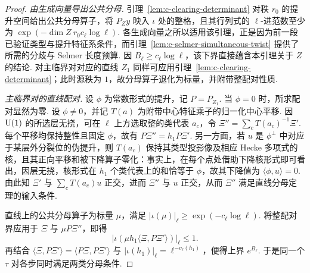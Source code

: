 \begin{proof}
\emph{由生成向量导出公共分母.}
引理~\ref{lem:c-clearing-determinant} 对秩 $r_0$ 的提升空间给出公共分母算子，将 $P_Zy$ 映入 $\iota$ 处的整格，且其行列式的 $\ell$-进范数至少为 $\exp(-\dim Z\ r_0 c_\ell\log\ell)$.
各生成向量之所以适用该引理，正是因为前一段已验证类型与提升特征系条件，而引理~\ref{lem:c-selmer-simultaneous-twist} 提供了所需的分歧与 Selmer 长度预算.
因 $B_\ell\ge c_\ell\log\ell$，该下界直接蕴含本引理关于 $Z$ 的结论.
对主临界对对应的直线 $Z_1$ 同样可应用引理~\ref{lem:c-clearing-determinant}；此时源秩为 $1$，故分母算子退化为标量，并附带整配对性质.

\emph{主临界对的直线配对.}
设 $\phi$ 为常数形式的提升，记 $P=P_{Z_1}$. 当 $\phi=0$ 时，所求配对显然为零.
设 $\phi\ne0$，并记 $T(a)$ 为附带中心特征乘子的归一化中心平移.
因 $\operatorname{U}(1)$ 的所选层无挠，可在 $\ell$ 上方选取整的类代表 $a_c$，令 $\Xi''=\sum_c T(a_c)^{-1}\Xi'$.
每个平移均保持整性且固定 $\phi$，故有 $P\Xi''=h_1P\Xi'$.
另一方面，若 $u$ 是 $\phi^\perp$ 中对应于某层外分裂位的伪提升，则 $T(a_c)$ 保持其类型投影像及相应 Hecke 多项式的核，且其正向平移和被下降算子零化：事实上，在每个点处借助下降核形式即可看出，因层无挠，核形式在 $h_1$ 个类代表上的和恰等于 $\phi$，故其下降值为 $\langle\phi,u\rangle=0$.
由此知 $\Xi'$ 与 $\sum_c T(a_c)u$ 正交，进而 $\Xi''$ 与 $u$ 正交，从而 $\Xi''$ 满足直线分母定理的输入条件.

直线上的公共分母算子为标量 $\mu$，满足 $|\iota(\mu)|_\ell\ge\exp(-c_\ell\log\ell)$.
将整配对界应用于 $\Xi$ 与 $\mu P\Xi''$，即得
\[
 |\iota(\mu h_1\langle\Xi,P\Xi'\rangle)|_\ell\le1 .
\]
再结合 $\langle\Xi,P\Xi'\rangle=\langle P\Xi,P\Xi'\rangle$ 与 $|\iota(h_1)|_\ell=\ell^{-v_\ell(h_1)}$，便得上界 $e^{B_\ell}$.
于是同一个 $\tau$ 对各步同时满足两类分母条件.
\end{proof}

